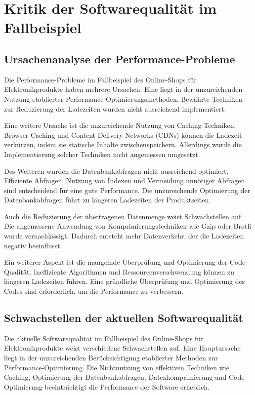 \section{Kritik der Softwarequalität im Fallbeispiel}

\subsection{Ursachenanalyse der Performance-Probleme}
Die Performance-Probleme im Fallbeispiel des Online-Shops für Elektronikprodukte haben mehrere Ursachen. Eine liegt in der unzureichenden Nutzung etablierter Performance-Optimierungsmethoden. Bewährte Techniken zur Reduzierung der Ladezeiten wurden nicht ausreichend implementiert.

Eine weitere Ursache ist die unzureichende Nutzung von Caching-Techniken. Browser-Caching und Content-Delivery-Networks (CDNs) können die Ladezeit verkürzen, indem sie statische Inhalte zwischenspeichern. Allerdings wurde die Implementierung solcher Techniken nicht angemessen umgesetzt.

Des Weiteren wurden die Datenbankabfragen nicht ausreichend optimiert. Effiziente Abfragen, Nutzung von Indexen und Vermeidung unnötiger Abfragen sind entscheidend für eine gute Performance. Die unzureichende Optimierung der Datenbankabfragen führt zu längeren Ladezeiten der Produktseiten.

Auch die Reduzierung der übertragenen Datenmenge weist Schwachstellen auf. Die angemessene Anwendung von Komprimierungstechniken wie Gzip oder Brotli wurde vernachlässigt. Dadurch entsteht mehr Datenverkehr, der die Ladezeiten negativ beeinflusst.

Ein weiterer Aspekt ist die mangelnde Überprüfung und Optimierung der Code-Qualität. Ineffiziente Algorithmen und Ressourcenverschwendung können zu längeren Ladezeiten führen. Eine gründliche Überprüfung und Optimierung des Codes sind erforderlich, um die Performance zu verbessern.

\subsection{Schwachstellen der aktuellen Softwarequalität}
Die aktuelle Softwarequalität im Fallbeispiel des Online-Shops für Elektronikprodukte weist verschiedene Schwachstellen auf. Eine Hauptursache liegt in der unzureichenden Berücksichtigung etablierter Methoden zur Performance-Optimierung. Die Nichtnutzung von effektiven Techniken wie Caching, Optimierung der Datenbankabfragen, Datenkomprimierung und Code-Optimierung beeinträchtigt die Performance der Software erheblich.

